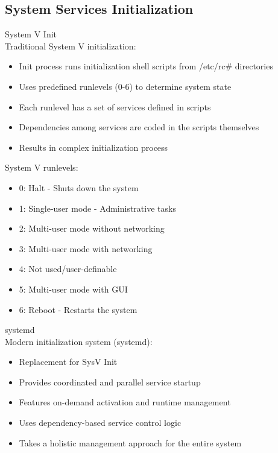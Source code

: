 \subsection{System Services Initialization}

\begin{definition}{System V Init}\\
    Traditional System V initialization:
    \begin{itemize}
        \item Init process runs initialization shell scripts from /etc/rc\# directories
        \item Uses predefined runlevels (0-6) to determine system state
        \item Each runlevel has a set of services defined in scripts
        \item Dependencies among services are coded in the scripts themselves
        \item Results in complex initialization process
    \end{itemize}
    
    System V runlevels:
    \begin{itemize}
        \item 0: Halt - Shuts down the system
        \item 1: Single-user mode - Administrative tasks
        \item 2: Multi-user mode without networking
        \item 3: Multi-user mode with networking
        \item 4: Not used/user-definable
        \item 5: Multi-user mode with GUI
        \item 6: Reboot - Restarts the system
    \end{itemize}
\end{definition}

\begin{definition}{systemd}\\
    Modern initialization system (systemd):
    \begin{itemize}
        \item Replacement for SysV Init
        \item Provides coordinated and parallel service startup
        \item Features on-demand activation and runtime management
        \item Uses dependency-based service control logic
        \item Takes a holistic management approach for the entire system
    \end{itemize}
\end{definition}

